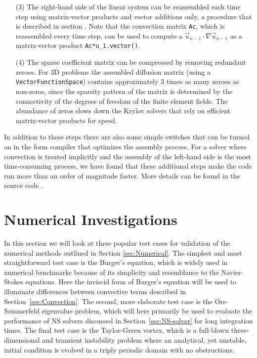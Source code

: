 \begin{itemize}
\item[(3)] The right-hand side of the linear system
can be reassembled each time step using matrix-vector products and
vector additions only, a procedure that is described in
section \cite{langtangen}. Note that the convection matrix {\fontsize{12pt}{12pt}\texttt{Ac}},
which is reassembled every time step, can be used to compute a
$\vec{u}_{n-1}\cdot\nabla\vec{u}_{n-1}$ as a matrix-vector
product {\fontsize{12pt}{12pt}\verb!Ac*u_1.vector()!}.

\item[(4)] The sparse coefficient matrix can be compressed by removing
redundant zeroes. For 3D problems the
assembled diffusion matrix (using a {\fontsize{12pt}{12pt}\texttt{VectorFunctionSpace}}) 
contains approximately 3 times as many zeroes as non-zeros, since
the sparsity pattern of the matrix is determined by the connectivity of
the degrees of freedom of the finite element fields. The
abundance of zeros slows down the Krylov solvers that rely on
efficient matrix-vector products for speed.

\end{itemize}
In addition to these steps there are also some simple switches that
can be turned on in the form compiler that optimizes the assembly
process. For a solver where convection is treated implicitly and the
assembly of the left-hand side is the most time-consuming process, we
have found that these additional steps make the code run more than an
order of magnitude faster. More details can be found in the source
code \cite{folder}.

\section{Numerical Investigations}
\label{sec:testcases}
In this section we will look at three popular test cases for validation of the numerical methods outlined in Section \ref{sec:Numerical}. The simplest and most straightforward test case is the Burger's equation, which is widely used in numerical benchmarks because of its simplicity and resemblance to the Navier-Stokes equations. Here the inviscid form of Burger's equation will be used to illuminate differences between convective terms described in Section~\ref{sec:Convection}. The second, more elaborate test case is the Orr-Sommerfeld eigenvalue problem, which will here primarily be used to evaluate the performance of NS solvers discussed in Section~\ref{sec:NS-solver} for long integration times. The final test case is the Taylor-Green vortex, which is a full-blown three-dimensional and transient instability problem where an analytical, yet unstable, initial condition is evolved in a triply periodic domain with no obstructions.


